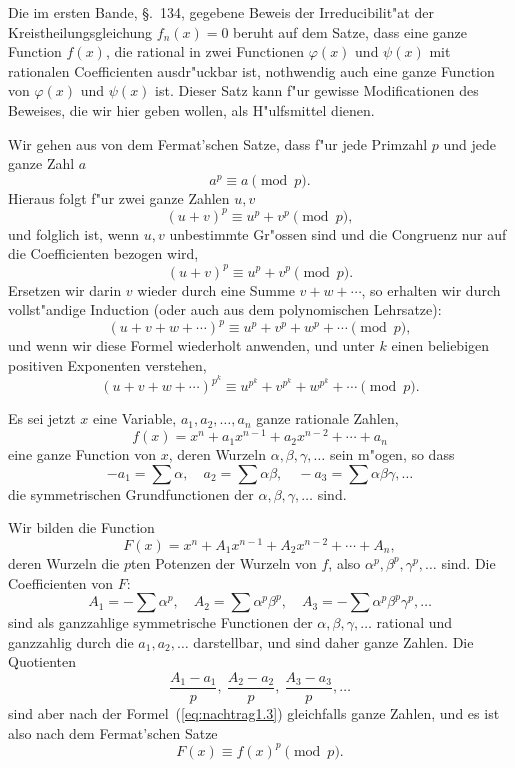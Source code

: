 \documentclass[10pt,a4paper]{article}
\theoremstyle{weberstyle}
\begin{document}
Die im ersten Bande, \S.~134, gegebene Beweis der Irreducibilit"at der
Kreistheilungsgleichung $f_n(x)=0$ beruht auf dem Satze, dass eine
 ganze Function $f(x)$, die rational in zwei Functionen $\varphi(x)$ und
$\psi(x)$ mit rationalen Coefficienten ausdr"uckbar ist, nothwendig auch
eine ganze Function von $\varphi(x)$ und $\psi(x)$ ist. Dieser Satz kann
f"ur gewisse Modificationen des Beweises, die wir hier geben wollen, als
H"ulfsmittel dienen.

Wir gehen aus von dem Fermat'schen Satze, dass f"ur jede Primzahl $p$
und jede ganze Zahl $a$
\[
a^p\equiv a\pmod{p}.
\]
Hieraus folgt f"ur zwei ganze Zahlen $u,v$
\[
(u+v)^p \equiv u^p+v^p\pmod{p},
\]
und folglich ist, wenn $u,v$ unbestimmte Gr"ossen sind und die Congruenz
nur auf die Coefficienten bezogen wird,
\begin{equation}\label{eq:nachtrag1.1}
(u+v)^p \equiv u^p+v^p\pmod{p}.
\end{equation}
Ersetzen wir darin $v$ wieder durch eine Summe $v+w+\cdots$, so erhalten
wir durch vollst"andige Induction (oder auch aus dem polynomischen
Lehrsatze):
\begin{equation}\label{eq:nachtrag1.2}
(u+v+w+\cdots)^p \equiv u^p+v^p+w^p+\cdots\pmod{p},
\end{equation}
und wenn wir diese Formel wiederholt anwenden, und unter $k$ einen
beliebigen positiven Exponenten verstehen,
\begin{equation}\label{eq:nachtrag1.3}
(u+v+w+\cdots)^{p^k} \equiv u^{p^k}+v^{p^k}+w^{p^k}+\cdots\pmod{p}.
\end{equation}

Es sei jetzt $x$ eine Variable, $a_1,a_2,\dots,a_n$ ganze rationale Zahlen,
\[
f(x) = x^n+a_1x^{n-1}+a_2x^{n-2}+\cdots+a_n
\]
eine ganze Function von $x$, deren Wurzeln $\alpha,\beta,\gamma,\dots$ sein
m"ogen, so dass
\[
-a_1=\sum\alpha,\quad a_2=\sum\alpha\beta,\quad
-a_3=\sum\alpha\beta\gamma,\dots
\]
die symmetrischen Grundfunctionen der $\alpha,\beta,\gamma,\dots$ sind.

Wir bilden die Function
\[
F(x) = x^n+A_1x^{n-1}+A_2x^{n-2}+\cdots+A_n,
\]
deren Wurzeln die $p$ten Potenzen der Wurzeln von $f$, also
$\alpha^p,\beta^p,\gamma^p,\dots$ sind. Die Coefficienten von $F$:
\[
A_1=-\sum\alpha^p,\quad A_2=\sum\alpha^p\beta^p,\quad
A_3=-\sum\alpha^p\beta^p\gamma^p,\dots
\]
sind als ganzzahlige symmetrische Functionen der $\alpha,\beta,\gamma,\dots$
rational und ganzzahlig durch die $a_1,a_2,\dots$ darstellbar, und sind
daher ganze Zahlen. Die Quotienten
\[
\frac{A_1-a_1}{p},\ \frac{A_2-a_2}{p},\ \frac{A_3-a_3}{p},\dots
\]
sind aber nach der Formel~(\ref{eq:nachtrag1.3}) gleichfalls ganze Zahlen,
und es ist also nach dem Fermat'schen Satze
\begin{equation}\label{eq:nachtrag1.4}
F(x) \equiv f(x)^p\pmod{p}.
\end{equation}
\end{document}
